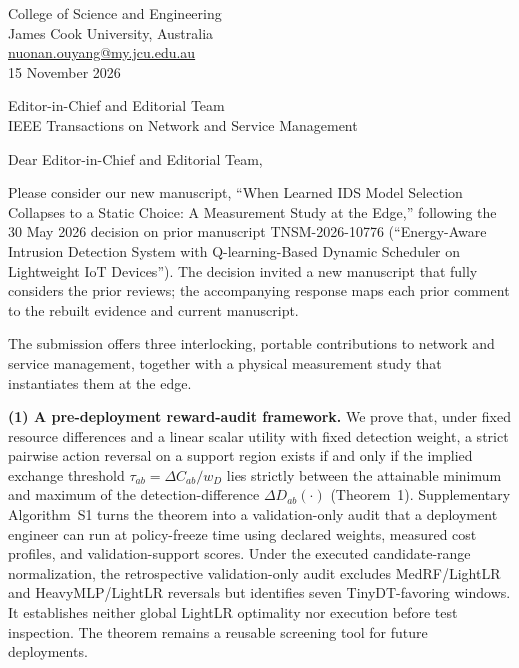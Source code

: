 \documentclass[11pt]{article}
\begin{document}
\thispagestyle{empty}

\begin{flushright}
College of Science and Engineering\\
James Cook University, Australia\\
\href{mailto:nuonan.ouyang@my.jcu.edu.au}{nuonan.ouyang@my.jcu.edu.au}\\
15 November 2026
\end{flushright}

\vspace{4pt}
Editor-in-Chief and Editorial Team\\
IEEE Transactions on Network and Service Management

\vspace{6pt}
Dear Editor-in-Chief and Editorial Team,

Please consider our new manuscript, ``When Learned IDS Model Selection Collapses to a Static Choice: A Measurement Study at the Edge,'' following the 30 May 2026 decision on prior manuscript TNSM-2026-10776 (``Energy-Aware Intrusion Detection System with Q-learning-Based Dynamic Scheduler on Lightweight IoT Devices''). The decision invited a new manuscript that fully considers the prior reviews; the accompanying response maps each prior comment to the rebuilt evidence and current manuscript.

The submission offers three interlocking, portable contributions to network and service management, together with a physical measurement study that instantiates them at the edge.

\textbf{(1) A pre-deployment reward-audit framework.} We prove that, under fixed resource differences and a linear scalar utility with fixed detection weight, a strict pairwise action reversal on a support region exists if and only if the implied exchange threshold $\tau_{ab}=\Delta C_{ab}/w_D$ lies strictly between the attainable minimum and maximum of the detection-difference $\Delta D_{ab}(\cdot)$ (Theorem~1). Supplementary Algorithm~S1 turns the theorem into a validation-only audit that a deployment engineer can run at policy-freeze time using declared weights, measured cost profiles, and validation-support scores. Under the executed candidate-range normalization, the retrospective validation-only audit excludes MedRF/LightLR and HeavyMLP/LightLR reversals but identifies seven TinyDT-favoring windows. It establishes neither global LightLR optimality nor execution before test inspection. The theorem remains a reusable screening tool for future deployments.
\end{document}
